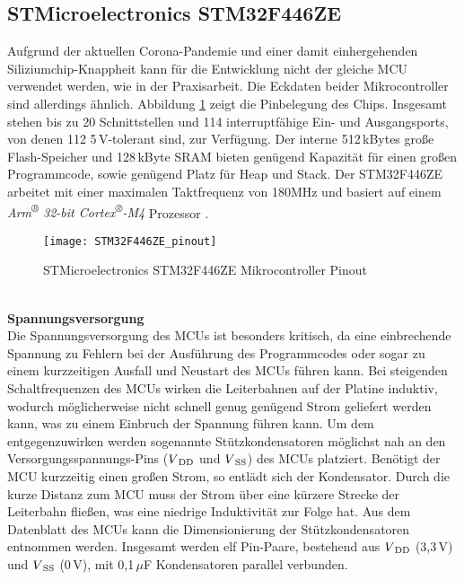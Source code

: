 
\subsection{STMicroelectronics STM32F446ZE}
\label{sec:STM}
Aufgrund der aktuellen Corona-Pandemie und einer damit einhergehenden Siliziumchip-Knappheit kann für die Entwicklung nicht der gleiche MCU verwendet werden, wie in der Praxisarbeit. Die Eckdaten beider Mikrocontroller sind allerdings ähnlich. Abbildung \ref{fig:MCU_pinout} zeigt die Pinbelegung des Chips. Insgesamt stehen bis zu 20 Schnittstellen und 114 interruptfähige Ein- und Ausgangsports, von denen 112 5\,V-tolerant sind, zur Verfügung. Der interne 512\,kBytes große Flash-Speicher und 128\,kByte SRAM bieten genügend Kapazität für einen großen Programmcode, sowie genügend Platz für Heap und Stack. Der STM32F446ZE arbeitet mit einer maximalen Taktfrequenz von 180MHz und basiert auf einem \textit{Arm\textsuperscript{®} 32-bit Cortex\textsuperscript{®}-M4} Prozessor \cite[S. 1]{STM32F446ZE_Datasheet}.
\begin{figure}[!htb]
	\begin{center}
		\texttt{[image: STM32F446ZE\_pinout]}
		\caption{STMicroelectronics STM32F446ZE Mikrocontroller Pinout \cite[S. 41]{STM32F446ZE_Datasheet}}
		\label{fig:MCU_pinout}
	\end{center}
\end{figure}\\
\newline
\hspace{-5mm}\textbf{Spannungsversorgung}\\
Die Spannungsversorgung des MCUs ist besonders kritisch, da eine einbrechende Spannung zu Fehlern bei der Ausführung des Programmcodes oder sogar zu einem kurzzeitigen Ausfall und Neustart des MCUs führen kann. Bei steigenden Schaltfrequenzen des MCUs wirken die Leiterbahnen auf der Platine induktiv, wodurch möglicherweise nicht schnell genug genügend Strom geliefert werden kann, was zu einem Einbruch der Spannung führen kann. Um dem entgegenzuwirken werden sogenannte Stützkondensatoren möglichst nah an den Versorgungsspannungs-Pins ($V\textsubscript{DD}$ und $V\textsubscript{SS}$) des MCUs platziert. Benötigt der MCU kurzzeitig einen großen Strom, so entlädt sich der Kondensator. Durch die kurze Distanz zum MCU muss der Strom über eine kürzere Strecke der Leiterbahn fließen, was eine niedrige Induktivität zur Folge hat. Aus dem Datenblatt \cite{F446RM} des MCUs kann die Dimensionierung der Stützkondensatoren entnommen werden. Insgesamt werden elf Pin-Paare, bestehend aus $V\textsubscript{DD}$ (3,3\,V) und $V\textsubscript{SS}$ (0\,V), mit 0,1\,$\mu$F Kondensatoren parallel verbunden.\\
